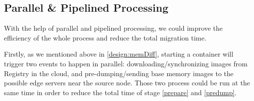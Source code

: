 







\subsection{Parallel \&  Pipelined Processing}\label{design:pipe}

With the help of parallel and pipelined processing,  we could improve the efficiency of the whole process and reduce the total migration time.


Firstly, as we mentioned above in \ref{design:memDiff}, starting a container will trigger two events to happen in parallel: downloading/synchronizing images from Registry in the cloud, and pre-dumping/sending base memory images to the possible edge servers near the source node. Those two process could be run at the same time in order to reduce the total time of stage \ref{prepare} and \ref{predump}. 


